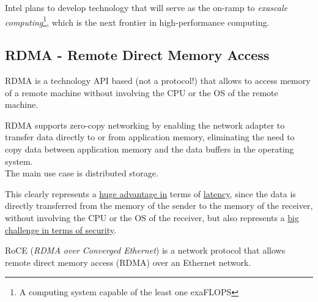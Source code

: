 Intel plans to develop technology that will serve as the on-ramp to \textit{exascale computing}\footnote{A computing system capable of the least one exaFLOPS}, which is the next frontier in high-performance computing.

\subsection{RDMA - Remote Direct Memory Access}

RDMA is a technology API based (not a protocol!) that allows to access memory of a remote machine without involving the CPU or the OS of the remote machine.

RDMA supports zero-copy networking by enabling the network adapter to transfer data directly to or from application memory, eliminating the need to copy data between application memory and the data buffers in the operating system.\\
The main use case is distributed storage.

This clearly represents a \ul{huge advantage in} terms of \ul{latency}, since the data is directly transferred from the memory of the sender to the memory of the receiver, without involving the CPU or the OS of the receiver, but also represents a \ul{big challenge in terms of security}.

RoCE (\textit{RDMA over Converged Ethernet}) is a network protocol that allows remote direct memory access (RDMA) over an Ethernet network.



